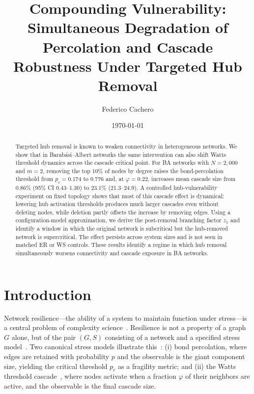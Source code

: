 \documentclass[aps,pre,twocolumn,superscriptaddress,showpacs]{revtex4-2}
\newcommand{\pc}{p_c}
\begin{document}
\title{Compounding Vulnerability: Simultaneous Degradation of Percolation and Cascade Robustness Under Targeted Hub Removal}

\author{Federico Cachero}

\date{\today}

\begin{abstract}
Targeted hub removal is known to weaken connectivity in heterogeneous networks. We show that in Barab\'asi--Albert networks the same intervention can also shift Watts threshold dynamics across the cascade critical point. For BA networks with $N=2{,}000$ and $m=2$, removing the top 10\% of nodes by degree raises the bond-percolation threshold from $\pc=0.174$ to $0.776$ and, at $\varphi=0.22$, increases mean cascade size from $0.86\%$ (95\% CI 0.43--1.30) to $23.1\%$ (21.3--24.9). A controlled hub-vulnerability experiment on fixed topology shows that most of this cascade effect is dynamical: lowering hub activation thresholds produces much larger cascades even without deleting nodes, while deletion partly offsets the increase by removing edges. Using a configuration-model approximation, we derive the post-removal branching factor $z_1$ and identify a window in which the original network is subcritical but the hub-removed network is supercritical. The effect persists across system sizes and is not seen in matched ER or WS controls. These results identify a regime in which hub removal simultaneously worsens connectivity and cascade exposure in BA networks.
\end{abstract}


\maketitle

\section{Introduction}
\label{sec:intro}

Network resilience---the ability of a system to maintain function under stress---is a central problem of complexity science~\cite{Boccaletti2006,Gao2016,Barabasi2016,Artime2024,Valdez2020}. Resilience is not a property of a graph $G$ alone, but of the pair $(G, S)$ consisting of a network and a specified stress model~\cite{Alderson2010}. Two canonical stress models illustrate this~\cite{Stauffer2014,Newman2010}: (i) bond percolation, where edges are retained with probability $p$ and the observable is the giant component size, yielding the critical threshold $\pc$ as a fragility metric; and (ii) the Watts threshold cascade~\cite{Watts2002}, where nodes activate when a fraction $\varphi$ of their neighbors are active, and the observable is the final cascade size.
\end{document}
